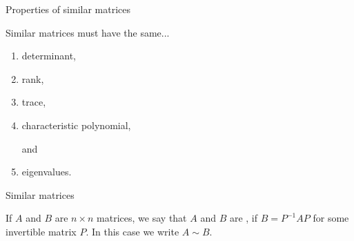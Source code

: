 \documentclass{ximera}
\begin{document}

Properties of similar matrices
\begin{expandable}{}{}
Similar matrices must have the same...
\begin{enumerate}
    \item determinant,

    \item rank,

    \item trace,

    \item characteristic polynomial, 

    and

    \item eigenvalues.

\end{enumerate}
\end{expandable}


Similar matrices
\begin{expandable}{}{}
    If $A$ and $B$ are $n \times n$ matrices, we say that $A$ and $B$ are , if $B = P^{-1}AP$ for some invertible matrix $P$.  In this case we write $A \sim B$.
\end{expandable}


 
\end{document}
